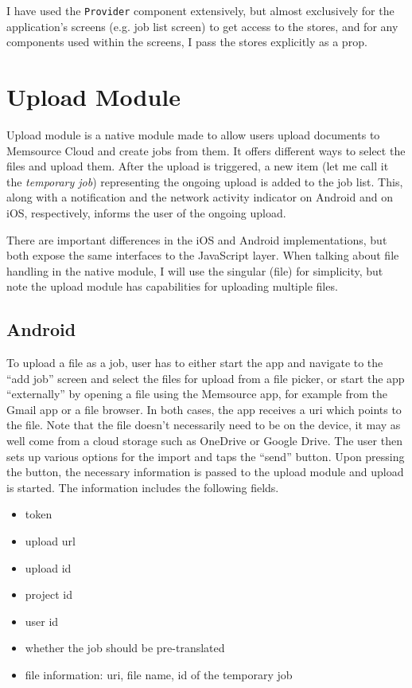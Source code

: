 

I have used the \texttt{Provider} component extensively, but almost exclusively for the application's screens (e.g. job list screen) to get access to the stores, and for any components used within the screens, I pass the stores explicitly as a prop.


\section{Upload Module}
Upload module is a native module made to allow users upload documents to Memsource Cloud and create jobs from them. It offers different ways to select the files and upload them. After the upload is triggered, a new item (let me call it the \textit{{temporary job}}) representing the ongoing upload is added to the job list. This, along with a notification and the network activity indicator on Android and on iOS, respectively, informs the user of the ongoing upload. 

There are important differences in the iOS and Android implementations, but both expose the same interfaces to the JavaScript layer. When talking about file handling in the native module, I will use the singular (file) for simplicity, but note the upload module has capabilities for uploading multiple files.


\subsection{Android}
To upload a file as a job, user has to either start the app and navigate to the “add job” screen and select the files for upload from a file picker, or start the app “externally” by opening a file using the Memsource app, for example from the Gmail app or a file browser. 
In both cases, the app receives a uri which points to the file. Note that the file doesn't necessarily need to be on the device, it may as well come from a cloud storage such as OneDrive or Google Drive. The user then sets up various options for the import and taps the “send” button. 
Upon pressing the button, the necessary information is passed to the upload module and upload is started. The information includes the following fields.

\begin{itemize}
	\item token
	\item upload url
	\item upload id
	\item project id
	\item user id
	\item whether the job should be pre-translated
	\item file information: uri, file name, id of the temporary job
\end{itemize}


